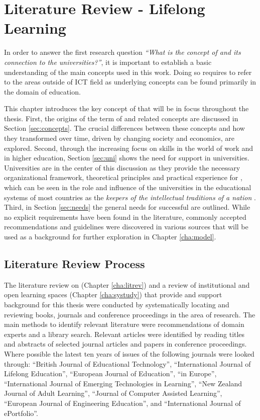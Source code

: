 \chapter{Literature Review - Lifelong Learning \label{cha:litrev}}
In order to answer the first research question \textit{``What is the concept of
\LLLs and its connection to the universities?''}, it is important to establish a
basic understanding of the main concepts used in this work. Doing so requires to
refer to the areas outside of ICT field as underlying concepts can be found
primarily in the domain of education.


This chapter introduces the key concept of \LLLs that will be in focus
throughout the thesis. First, the origins of the term of \textit{\LLLsn} and
related concepts are discussed in Section \ref{sec:concepts}. The crucial
differences between these concepts and how they transformed over time, driven by
changing society and economics, are explored. Second, through the increasing
focus on \LLLs skills in the world of work and in higher education, Section
\ref{sec:uni} shows the need for \LLLs support in universities. Universities are
in the center of this discussion as they provide the necessary organizational
framework, theoretical principles and practical experience for \LLLs
\citep{Knapper2000}, which can be seen in the role and influence of the
universities in the educational systems of most countries as the \textit{keepers
of the intellectual traditions of a nation} \citep[p.~96]{Longworth2003}. Third,
in Section \ref{sec:needs} the general needs for successful \LLLs are outlined.
While no explicit requirements have been found in the literature, commonly
accepted recommendations and guidelines were discovered in various sources that
will be used as a background for further exploration in Chapter \ref{cha:model}.

\section{Literature Review Process}
The literature review on \LLLs (Chapter \ref{cha:litrev}) and a review of
institutional and open learning spaces (Chapter \ref{cha:systudy}) that provide
and support background for this thesis were conducted by systematically locating
and reviewing books, journals and conference proceedings in the area of
research. The main methods to identify relevant literature were recommendations
of domain experts and a library search. Relevant articles were identified by
reading titles and abstracts of selected journal articles and papers in
conference proceedings. Where possible the latest ten years of issues of the
following journals were looked through: ``British Journal of Educational
Technology'', ``International Journal of Lifelong Education'', ``European
Journal of Education'', ``\LLLc in Europe'', ``International Journal of Emerging
Technologies in Learning'', ``New Zealand Journal of Adult Learning'', ``Journal
of Computer Assisted Learning'', ``European Journal of Engineering Education'',
and ``International Journal of ePortfolio''. 


